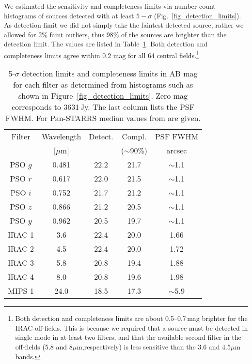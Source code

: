 \documentclass[mathleft,fleqn,%
]{an}
\begin{document}
We estimated the sensitivity and completeness limits via
number count histograms of sources detected with at least $5-\sigma$
(Fig.~\ref{fig_detection_limits}). 
As detection limit we did not simply take the faintest detected source,
rather we allowed for 2\% faint outliers, thus 98\% of the sources are
brighter than the detection limit.
The values are listed in Table~\ref{tab_detection_limits}.
Both detection and completeness limits 
agree within 0.2 mag for
all 64 central fields.\footnote{Both detection and completeness limits
  are about 0.5--0.7\,mag brighter for the IRAC off-fields.
  This is because we required that a source must be detected in single
  mode in at least two filters, and that the available second filter
  in the off-fields (5.8 and 8$\mu$m,respectively) is less sensitive than the 
  3.6 and 4.5$\mu$m bands.
} 

\begin{table}
\renewcommand{\thetable}{\arabic{table}}
\centering
\caption{5-$\sigma$ detection limits and 
  completeness limits in AB mag for each filter as determined from 
  histograms such as shown in Figure~\ref{fig_detection_limits}. 
  Zero mag corresponds to 3631\,Jy.
  The last column lists the PSF FWHM.
  For Pan-STARRS median values from \citet{Magnier16} are given.
} 
\label{tab_detection_limits}
\setlength{\tabcolsep}{2.7pt}
\begin{tabular}{ccccc}
\hline
\hline
Filter & Wavelength & Detect. & Compl.       & PSF FWHM \\
        & [$\mu$m] &          & ($\sim$90\%) & arcsec \\
\hline
PSO $g$  & 0.481    & 22.2  & 21.7  &  $\sim$1.1     \\
PSO $r$  & 0.617    & 22.0  & 21.5  &  $\sim$1.1     \\
PSO $i$  & 0.752    & 21.7  & 21.2  &  $\sim$1.1     \\
PSO $z$  & 0.866    & 21.2  & 20.5  &  $\sim$1.1     \\
PSO $y$  & 0.962    & 20.5  & 19.7  &  $\sim$1.1     \\
IRAC 1   & 3.6      & 22.4  & 20.0  &  1.66          \\
IRAC 2   & 4.5      & 22.4  & 20.0  &  1.72          \\
IRAC 3   & 5.8      & 20.8  & 19.4  &  1.88          \\
IRAC 4   & 8.0      & 20.8  & 19.6  &  1.98          \\
MIPS 1   &24.0      & 18.5  & 17.3  &  $\sim$5.9     \\
\hline
\end{tabular}
\end{table}
\end{document}
